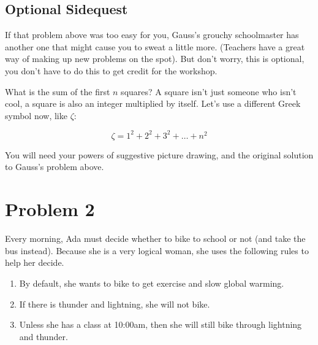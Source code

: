 \documentclass{article}
\begin{document}
\subsection{Optional Sidequest}

If that problem above was too easy for you, Gauss's grouchy
schoolmaster has another one that might cause you to sweat a little more.
(Teachers have a great way of making up new problems on the spot).
But don't worry, this is optional, you don't have to do this to get
credit for the workshop.

What is the sum of the first $n$ squares? A square isn't just someone
who isn't cool, a square is also an integer multiplied by itself.
Let's use a different Greek symbol now, like $\zeta$:

\begin{equation}
\zeta = 1^2 + 2^2 + 3^2 + \ldots + n^2
\end{equation}

You will need your powers of suggestive picture drawing, and the
original solution to Gauss's problem above.




\pagebreak

\section{Problem 2}

Every morning, Ada must decide whether to bike to school or not
(and take the bus instead).
Because she is a very logical woman,
she uses the following rules to help her decide.

\begin{enumerate}
\item
By default, she wants to bike to get exercise and slow global warming.
\item
If there is thunder and lightning, she will not bike.
\item
Unless she has a class at 10:00am, then she will still bike through
lightning and thunder.
\end{enumerate}
\end{document}
